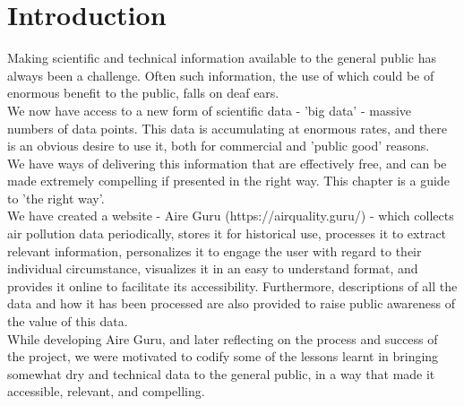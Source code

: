 \newpage
\section{Introduction}

Making scientific and technical information available to the general public has always been a challenge.
Often such information, the use of which could be of enormous benefit to the public, falls on deaf ears.\\

We now have access to a new form of scientific data - 'big data' - massive numbers of data points.
This data is accumulating at enormous rates, and there is an obvious desire to use it, both for
commercial and 'public good' reasons.\\

We have ways of delivering this information that are effectively free, and can be made extremely compelling
if presented in the right way. This chapter is a guide to 'the right way'.\\

We have created a website - Aire Guru (https://airquality.guru/) - which collects air pollution data periodically, stores it for historical use, 
processes it to extract relevant information, personalizes it to engage the user with regard to their individual
circumstance, visualizes it in an easy to understand format, and provides it online to facilitate its accessibility. Furthermore,
descriptions of all the data and how it has been processed are also provided to raise public awareness of the value
of this data.\\

While developing Aire Guru, and later reflecting on the process and success of the project, we were motivated to codify
some of the lessons learnt in bringing somewhat dry and technical data to the general public, in a way that made it 
accessible, relevant, and compelling.\\

